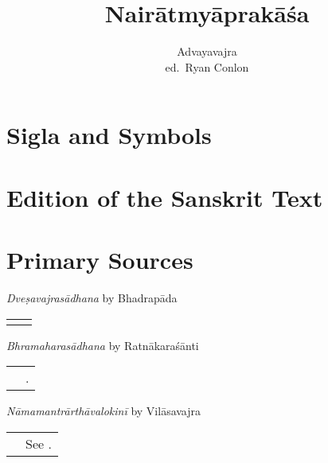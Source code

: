 \documentclass[12pt,twoside]{article}
\title{Nairātmyāprakāśa}
\author{Advayavajra \\ ed.\ Ryan Conlon}
\newcommand{\mybibexclude}[1]{\addtocategory{fullcited}{#1}}
\begin{document}
	\maketitle

\pagestyle{fancy}
\fancyhf{}
\fancyhead[LE,RO]{\thepage}

   \section{Sigla and Symbols}	
	

	\section{Edition of the Sanskrit Text}
	

%	

%	


	\EmbracOff

	\section*{Primary Sources}
\bigskip\noindent\emph{Dveṣavajrasādhana} by Bhadrapāda\\
\noindent\begin{tabular}{ p{} p{} }
	& \cite*[vol.\ 2 pp.\ 335–360]{gerloff2020} 
\end{tabular}

\bigskip\noindent\emph{Bhramaharasādhana} by Ratnākaraśānti\\
\noindent\begin{tabular}{ p{} p{} }
	& \fullcite*{isaacson2002}.\mybibexclude{isaacson2002} 
\end{tabular}

\bigskip\noindent\emph{Nāmamantrārthāvalokinī} by Vilāsavajra\\
\noindent\begin{tabular}{ p{} p{} }
	& See \textcite{tribe2016}.
\end{tabular}
\end{document}
